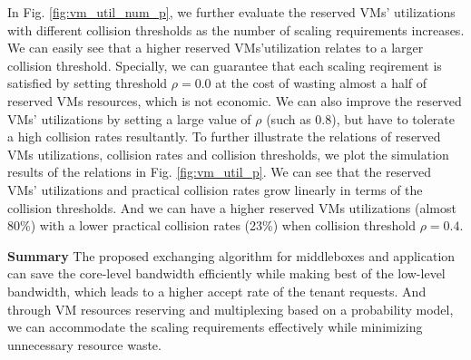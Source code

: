 \documentclass[review]{elsarticle}
\begin{document}
In Fig. \ref{fig:vm_util_num_p}, we further evaluate the reserved VMs' utilizations with different collision thresholds as the number of scaling requirements increases. We can easily see that a higher reserved VMs'utilization relates to a larger collision threshold. Specially, we can guarantee that each scaling reqirement is satisfied by setting threshold $\rho=0.0$ at the cost of wasting almost a half of reserved VMs resources, which is not economic. We can also improve the reserved VMs' utilizations by setting a large value of $\rho$ (such as 0.8), but have to tolerate a high collision rates resultantly. To further illustrate the relations of reserved VMs utilizations, collision rates and collision thresholds, we plot the simulation results of the relations in Fig. \ref{fig:vm_util_p}.
We can see that the reserved VMs' utilizations and practical collision rates grow linearly in terms of the collision thresholds. And we can have a higher reserved VMs utilizations (almost 80\%) with a lower practical collision rates (23\%) when collision threshold $\rho=0.4$. 

\textbf{Summary}
The proposed exchanging algorithm for middleboxes and application can save the core-level bandwidth efficiently while making best of the low-level bandwidth, which leads to a higher accept rate of the tenant requests. And through VM resources reserving and multiplexing based on a probability model, we can accommodate the scaling requirements effectively while minimizing unnecessary resource waste.  
\end{document}
